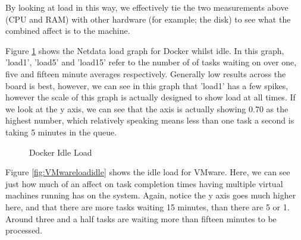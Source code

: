 By looking at load in this way, we effectively tie the two measurements above (CPU and RAM) with other hardware (for example; the disk) to see what the combined affect is to the machine.

Figure \ref{fig:Dockerloadidle} shows the Netdata load graph for Docker whilst idle. In this graph, 'load1', 'load5' and 'load15' refer to the number of of tasks waiting on over one, five and fifteen minute averages respectively. Generally low results across the board is best, however, we can see in this graph that 'load1' has a few spikes, however the scale of this graph is actually designed to show load at all times. If we look at the y axis, we can see that the axis is actually showing 0.70 as the highest number, which relatively speaking means less than one task a second is taking 5 minutes in the queue.

\begin{figure}[H]
\caption{Docker Idle Load}
\label{fig:Dockerloadidle}
\centering
\end{figure}

Figure \ref{fig:VMwareloadidle} shows the idle load for VMware. Here, we can see just how much of an affect on task completion times having multiple virtual machines running has on the system. Again, notice the y axis goes much higher here, and that there are more tasks waiting 15 minutes, than there are 5 or 1. Around three and a half tasks are waiting more than fifteen minutes to be processed.

